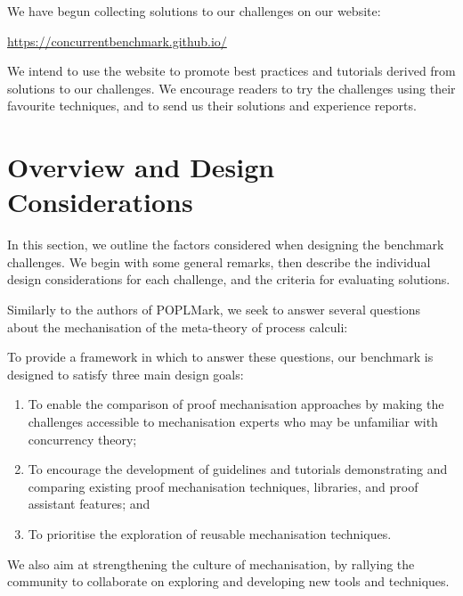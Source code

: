 \documentclass[runningheads]{llncs}
\begin{document}
We have begun collecting solutions to our challenges on our website:
\begin{center}
  \url{https://concurrentbenchmark.github.io/}
\end{center}
We intend to use the website to promote best practices and tutorials derived from solutions to our challenges.
We encourage readers to try the challenges using their favourite techniques, and to send us their solutions and experience reports.

\section{Overview and Design Considerations}\label{sec:design-discussion}
In this section, we outline the factors considered when designing the benchmark challenges.
We begin with some general remarks, then describe the individual design considerations for each challenge, and the criteria for evaluating solutions.

Similarly to the authors of POPLMark, we seek to answer several questions about the mechanisation of the meta-theory of process calculi:

To provide a framework in which to answer these questions, our benchmark is designed to satisfy three main design goals:
\begin{enumerate}[label=\textbf{(G\arabic*)},leftmargin=10mm]
\item\label{item:goal-comperison-accessibility} To enable the comparison of
  proof mechanisation approaches by making the challenges accessible to
  mechanisation experts who may be unfamiliar with concurrency theory;

\item\label{item:goal-tutorials} To encourage the development of guidelines and
  tutorials demonstrating and comparing existing proof mechanisation
  techniques, libraries, and proof assistant features; and

\item\label{item:goal-reusability} To prioritise the exploration of reusable mechanisation techniques.
\end{enumerate}
We also aim at strengthening the culture of mechanisation, by rallying the community to collaborate on exploring and developing new tools and techniques.
\end{document}
